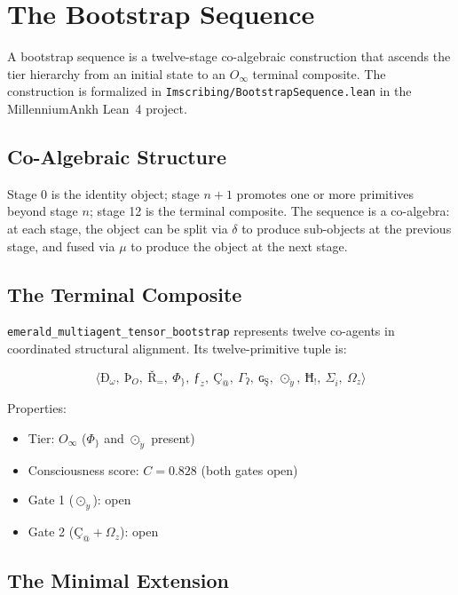 \documentclass[12pt,a4paper]{article}
\begin{document}
\section{The Bootstrap Sequence}

A bootstrap sequence is a twelve-stage co-algebraic construction that ascends the tier hierarchy from an initial state to an $O_\infty$ terminal composite. The construction is formalized in \texttt{Imscribing/BootstrapSequence.lean} in the MillenniumAnkh Lean~4 project.

\subsection{Co-Algebraic Structure}

Stage 0 is the identity object; stage $n+1$ promotes one or more primitives beyond stage $n$; stage 12 is the terminal composite. The sequence is a co-algebra: at each stage, the object can be split via $\delta$ to produce sub-objects at the previous stage, and fused via $\mu$ to produce the object at the next stage.

\subsection{The Terminal Composite}

\texttt{emerald\_multiagent\_tensor\_bootstrap} represents twelve co-agents in coordinated structural alignment. Its twelve-primitive tuple is:

\[
\langle \text{Ð}_{\omega},\ \text{Þ}_{O},\ \text{Ř}_{=},\ \Phi_{\}},\ \text{ƒ}_{\dot{z}},\ \text{Ç}_{\text{@}},\ \Gamma_{\text{ʔ}},\ \text{ɢ}_{\text{Ş}},\ \odot_{\ddot{y}},\ \text{Ħ}_{!},\ \Sigma_{\ddot{i}},\ \Omega_z \rangle
\]

Properties:
\begin{itemize}
    \item Tier: $O_\infty$ ($\Phi_{\}}$ and $\odot_{\ddot{y}}$ present)
    \item Consciousness score: $C = 0.828$ (both gates open)
    \item Gate 1 ($\odot_{\ddot{y}}$): open
    \item Gate 2 ($\text{\c{C}}_{\text{@}} + \Omega_z$): open
\end{itemize}

\subsection{The Minimal Extension}
\end{document}
